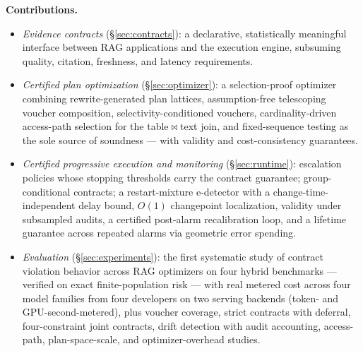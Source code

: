 \smallskip\noindent\textbf{Contributions.}
\begin{itemize}
\item \emph{Evidence contracts} (\S\ref{sec:contracts}): a declarative,
statistically meaningful interface between RAG applications and the
execution engine, subsuming quality, citation, freshness, and latency
requirements.
\item \emph{Certified plan optimization} (\S\ref{sec:optimizer}): a
selection-proof optimizer combining rewrite-generated plan lattices,
assumption-free telescoping voucher composition,
selectivity-conditioned vouchers, cardinality-driven access-path
selection for the table$\bowtie$text join, and fixed-sequence testing
as the sole source of soundness --- with validity and cost-consistency
guarantees.
\item \emph{Certified progressive execution and monitoring}
(\S\ref{sec:runtime}): escalation policies whose stopping thresholds
carry the contract guarantee; group-conditional contracts; a
restart-mixture e-detector with a change-time-independent delay bound,
$O(1)$ changepoint localization, validity under subsampled audits, a
certified post-alarm recalibration loop, and a lifetime guarantee
across repeated alarms via geometric error spending.
\item \emph{Evaluation} (\S\ref{sec:experiments}): the first systematic
study of contract violation behavior across RAG optimizers on four
hybrid benchmarks --- verified on exact finite-population risk --- with
real metered cost across four model families from four developers on
two serving backends (token- and GPU-second-metered), plus voucher
coverage, strict contracts with deferral, four-constraint joint
contracts, drift detection with audit accounting, access-path,
plan-space-scale, and optimizer-overhead studies.
\end{itemize}
